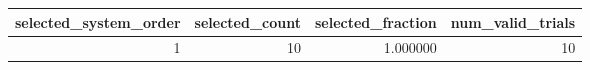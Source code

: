 \begin{tabular}{rrrr}
\toprule
selected_system_order & selected_count & selected_fraction & num_valid_trials \\
\midrule
1 & 10 & 1.000000 & 10 \\
\bottomrule
\end{tabular}
